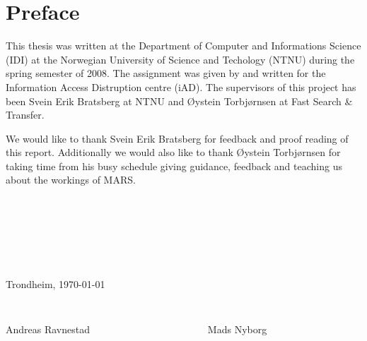 \chapter*{Preface}

This thesis was written at the Department of Computer and Informations Science
(IDI) at the Norwegian University of Science and Techology (NTNU) during the
spring semester of 2008. The assignment was given by and written for the
Information Access Distruption centre (iAD). The supervisors of this project
has been Svein Erik Bratsberg at NTNU and \O ystein Torbj\o rnsen at Fast
Search \& Transfer.

We would like to thank Svein Erik Bratsberg for feedback and proof reading of
this report. Additionally we would also like to thank \O ystein Torbj\o rnsen
for taking time from his busy schedule giving guidance, feedback and teaching
us about the workings of MARS.

\begin{verbatim}







\end{verbatim}
\begin{center}

Trondheim, \today

\begin{verbatim}


\end{verbatim}
Andreas Ravnestad \verb!                      ! Mads Nyborg
\end{center}

